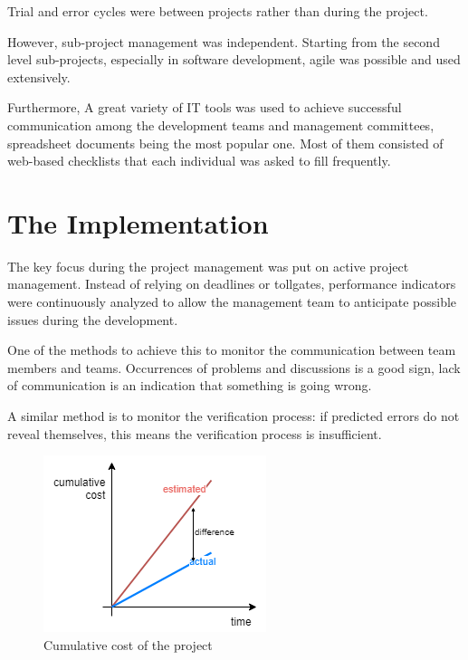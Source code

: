 \documentclass[journal]{IEEEtran}
\begin{document}
Trial and error cycles were between projects rather than during the project.

However, sub-project management was independent. Starting from the second level sub-projects, especially in software development, agile was possible and used extensively.



Furthermore, A great variety of IT tools was used to achieve successful communication among the development teams and management committees, spreadsheet documents being the most popular one. Most of them consisted of web-based checklists that each individual was asked to fill frequently.

\section{The Implementation}
The key focus during the project management was put on active project management. Instead of relying on deadlines or tollgates, performance indicators were continuously analyzed to allow the management team to anticipate possible issues during the development. 

One of the methods to achieve this to monitor the communication between team members and teams. Occurrences of problems and discussions is a good sign, lack of communication is an indication that something is going wrong. 

A similar method is to monitor the verification process: if predicted errors do not reveal themselves, this means the verification process is insufficient. 

\begin{figure}[h]
    \centering
    \includegraphics[width=0.8\linewidth]{cost.png}
    \caption{Cumulative cost of the project}
    \label{fig:cost}
\end{figure}
\end{document}
